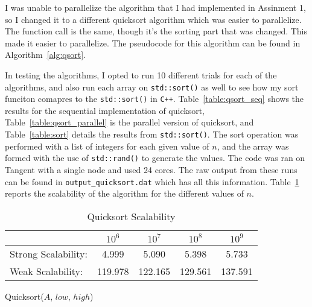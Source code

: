 \documentclass[addpoints]{exam}
\begin{document}
\begin{questions}
\begin{solution}
I was unable to parallelize the algorithm that I had implemented in Assinment 1, so I changed it to a different quicksort algorithm \cite{qsort} which was easier to parallelize. The function call is the same, though it's the sorting part that was changed. This made it easier to parallelize. The pseudocode for this algorithm can be found in Algorithm~\ref{alg:qsort}.

In testing the algorithms, I opted to run 10 different trials for each of the algorithms, and also run each array on \verb~std::sort()~ as well to see how my sort funciton comapres to the \verb~std::sort()~ in \verb~C++~. Table~\ref{table:qsort_seq} shows the results for the sequential implementation of quicksort, Table~\ref{table:qsort_parallel} is the parallel version of quicksort, and Table~\ref{table:sort} details the results from \verb~std::sort()~. The sort operation was performed with a list of integers for each given value of $n$, and the array was formed with the use of \verb~std::rand()~ to generate the values. The code was ran on Tangent with a single node and used 24 cores. The raw output from these runs can be found in {\tt output\_quicksort.dat} which has all this information. Table~\ref{table:qsort_scale} reports the scalability of the algorithm for the different values of $n$.

\begin{table}[H]
\centering
\caption{Quicksort Scalability}
\begin{tabular}{ l | c c c c}
\hline\hline
& $10^{6}$ & $10^{7}$ & $10^{8}$ & $10^{9}$\\
\hline
Strong Scalability: & 4.999 & 5.090 & 5.398 & 5.733\\
Weak Scalability: & 119.978 & 122.165 & 129.561 & 137.591\\
\hline\hline
\end{tabular}
\label{table:qsort_scale}
\end{table}

\begin{algorithm}[H]
\caption{Quicksort($A$, $low$, $high$)}
\begin{algorithmic}[1]
  \ENDWHILE
  \ENDWHILE
  \ENDIF
\ENDWHILE
{}
\ENDIF
{}
\ENDIF
\end{algorithmic}
\label{alg:qsort}
\end{algorithm}


\end{solution}
\end{questions}
\end{document}
